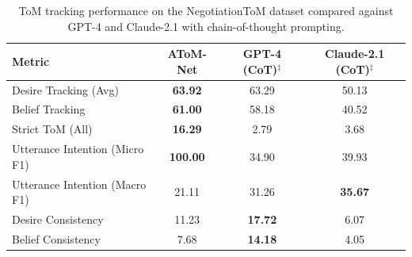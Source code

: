 \documentclass[11pt]{article}
\begin{document}
\begin{table}[t]
\centering
\renewcommand{\arraystretch}{1.15}
\setlength{\tabcolsep}{10pt}

\begin{tabular}{lccc}
\toprule
\textbf{Metric} & \textbf{AToM-Net} & \textbf{GPT-4 (CoT)$^{\ddagger}$} & \textbf{Claude-2.1 (CoT)$^{\ddagger}$} \\
\midrule

Desire Tracking (Avg)            & \textbf{63.92} & 63.29 & 50.13 \\
Belief Tracking                  & \textbf{61.00} & 58.18 & 40.52 \\
Strict ToM (All)                 & \textbf{16.29} & 2.79  & 3.68  \\

Utterance Intention (Micro F1)   & \textbf{100.00} & 34.90 & 39.93 \\
Utterance Intention (Macro F1)   & 21.11 & 31.26 & \textbf{35.67} \\

\midrule

Desire Consistency               & 11.23 & \textbf{17.72} & 6.07 \\
Belief Consistency               & 7.68  & \textbf{14.18} & 4.05 \\

\bottomrule
\end{tabular}
\caption{ToM tracking performance on the NegotiationToM dataset compared against GPT-4 and Claude-2.1 with chain-of-thought prompting. }
\label{tab:tom_precision}

\end{table}
\end{document}
